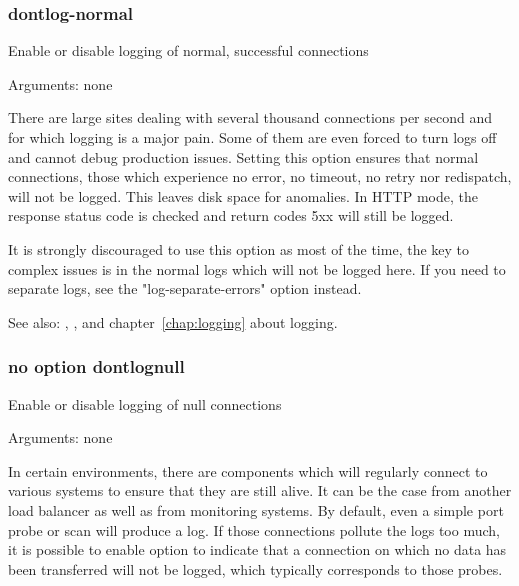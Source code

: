 \subsubsection[dontlog-normal]{}
\subsubsection*{dontlog-normal}


  Enable or disable logging of normal, successful connections


  Arguments: none

  There are large sites dealing with several thousand connections per second
  and for which logging is a major pain. Some of them are even forced to turn
  logs off and cannot debug production issues. Setting this option ensures that
  normal connections, those which experience no error, no timeout, no retry nor
  redispatch, will not be logged. This leaves disk space for anomalies. In HTTP
  mode, the response status code is checked and return codes 5xx will still be
  logged.

  It is strongly discouraged to use this option as most of the time, the key to
  complex issues is in the normal logs which will not be logged here. If you
  need to separate logs, see the "log-separate-errors" option instead.


See also: , ,  and chapter~\ref{chap:logging} about
             logging.

\subsubsection[dontlognull]{}
\subsubsection*{no option dontlognull}


  Enable or disable logging of null connections


  Arguments: none

  In certain environments, there are components which will regularly connect to
  various systems to ensure that they are still alive. It can be the case from
  another load balancer as well as from monitoring systems. By default, even a
  simple port probe or scan will produce a log. If those connections pollute
  the logs too much, it is possible to enable option  to indicate
  that a connection on which no data has been transferred will not be logged,
  which typically corresponds to those probes.

